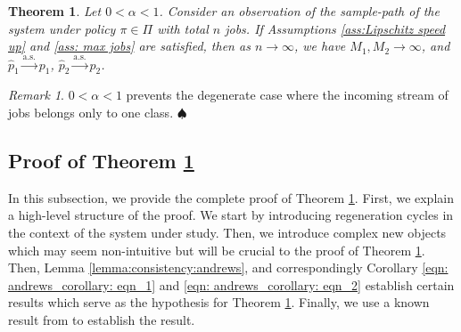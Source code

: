 \documentclass[11pt]{article}
\newcommand{\jp}[1]{\footnote{J-P: #1}}
\newtheorem{theorem}{Theorem}[section]
\theoremstyle{remark}
\newtheorem{remark}[thm]{Remark}
\theoremstyle{definition}
\numberwithin{equation}{section}
\begin{document}
\begin{theorem} \label{theorem:strong consistency}
    Let $0 < \alpha < 1$. Consider an observation of the sample-path of the system under policy $\pi \in \Pi$ with total $n$ jobs. If Assumptions \ref{ass:Lipschitz speed up} and \ref{ass: max jobs} are satisfied, then as $n \rightarrow \infty$, we have $M_1, M_2 \rightarrow \infty$, and $\widehat{p}_1 \overset{\text{a.s.}}{\rightarrow } p_1$, $\widehat{p}_2 \overset{\text{a.s.}} {\rightarrow}p_2$. 
\end{theorem}
\begin{remark}
    $0 < \alpha < 1$ prevents the degenerate case where the incoming stream of jobs belongs only to one class. \hfill $\spadesuit$
\end{remark}

\subsection{Proof of Theorem \ref{theorem:strong consistency}} \label{subsection:proof:theorem:strong consistency}

In this subsection, we provide the complete proof of Theorem \ref{theorem:strong consistency}.
First, we explain a high-level structure of the proof. 
We start by introducing regeneration cycles in the context of the system under study.
Then, we introduce complex new objects which may seem non-intuitive but will be crucial to the proof of Theorem \ref{theorem:strong consistency}.
Then, Lemma \ref{lemma:consistency:andrews}, and correspondingly Corollary \ref{eqn: andrews_corollary: eqn_1} and \ref{eqn: andrews_corollary: eqn_2} establish certain results which serve as the hypothesis for Theorem \ref{theorem:strong consistency}.
Finally, we use a known result from \cite{andrews1992} to establish the result.
\end{document}
